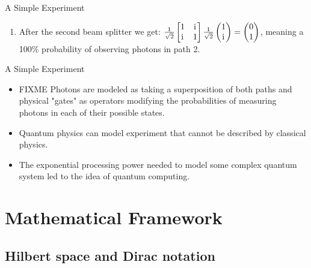 \documentclass[svgnames,smaller,aspectratio=169]{beamer}
\begin{document}
\begin{frame}[fragile]{A Simple Experiment \cite{interfer}}
\begin{enumerate}
  \item After the second beam splitter we get: $\frac{1}{\sqrt{2}}\begin{bmatrix} 1 & \mathrm{i}\mkern1mu \\ \mathrm{i}\mkern1mu & 1 \end{bmatrix}
    \frac{1}{\sqrt{2}} \begin{pmatrix} 1 \\ \mathrm{i}\mkern1mu \end{pmatrix} = \begin{pmatrix} 0 \\ 1 \end{pmatrix}$, meaning a 100\%
    probability of observing photons in path 2.
  \end{enumerate}
\end{frame}

\begin{frame}[fragile]{A Simple Experiment \cite{interfer}}
  \begin{itemize}
  \item FIXME Photons are modeled as taking a superposition of both paths and physical "gates"  as operators modifying the
    probabilities of measuring photons in each of their possible states.
  \end{itemize}
    \begin{itemize}
  \item Quantum physics can model experiment that cannot be described by classical physics.
  \item The exponential processing power needed to model some complex quantum system led to the idea of quantum
    computing.
  \end{itemize}
\end{frame}
  
\section{Mathematical Framework}

\subsection{Hilbert space and Dirac notation}
\end{document}
